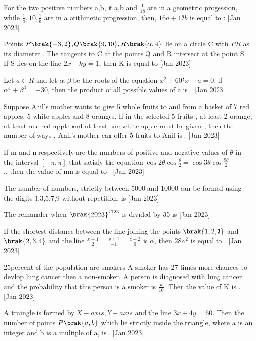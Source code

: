 
\iffalse
  \title{2023}
  \author{ai24btech11005}
  \section{integer}
\fi
    \item For the two positive numbers a,b, if a,b and $\frac{1}{18}$ are in a geometric progession, while $\frac{1}{a},10,\frac{1}{b}$ are in a arithmetic progression, then, $16a+12b$ is equal to :
    \hfill{[Jan 2023]}
    \item Points $P\brak{-3,2},Q\brak{9,10},R\brak{\alpha,4}$ lie on a circle C with $PR$ as its diameter . The tangents to C at the points Q and R intersect at the point S. If S lies on the line $2x-ky=1$, then K is equal to 
     \hfill{[Jan 2023]}
    \item Let $a\in R$ and let $\alpha,\beta$ be the roots of the equation $x^2+60^{\frac{1}{4}}x+a=0$. If $\alpha^4 +\beta^4=-30$, then the product of all possible values of a is .
 \hfill{[Jan 2023]}
    \item Suppose Anil's mother wants to give 5 whole fruits to anil from a basket of 7 red apples, 5 white apples and 8 oranges. If in the selected 5 fruits , at least 2 orange, at least one red apple and at least one white apple must be given , then the number of ways , Anil's  mother can offer 5 fruits to Anil is   .
     \hfill{[Jan 2023]}
    \item If m and n respectively are the numbers of positive and negative values of $\theta$ in the interval $[-\pi,\pi]$ that satisfy the equation $\cos 2\theta \cos{\frac{\theta}{2}}=\cos 3\theta \cos{\frac{9\theta}{2}}$ \\,, then the value of mn is equal to .
     \hfill{[Jan 2023]}

    \item The number of numbers, strictly between 5000 and 10000 can be formed using the digits 1,3,5,7,9 without repetition, is 
     \hfill{[Jan 2023]}
    \item The remainder when $\brak{2023}^{2023}$ is divided by 35 is 
     \hfill{[Jan 2023]}

    \item If the shortest distance between the line joining the points $\brak{1,2,3}$ and $\brak{2,3,4}$ and the line $\frac{x-1}{2}=\frac{y+1}{-1}=\frac{z-2}{0}$ is $\alpha$, then $28\alpha^2$ is equal to . 
     \hfill{[Jan 2023]}
    \item 25percent of the population are smokers A smoker has 27 times more chances to devlop lung cancer then a non-smoker. A person is diagnosed with lung cancer and the probability that this person is a smoker is $\frac{k}{10}.$ Then the value of K is .
     \hfill{[Jan 2023]}
    \item A traingle is formed by $X-axis,Y-axis$ and the line $3x+4y=60$. Then the number of points $P\brak{a,b}$  which lie strictly inside  the triangle, where a is an integer and b is a multiple of a, is .
     \hfill{[Jan 2023]}

